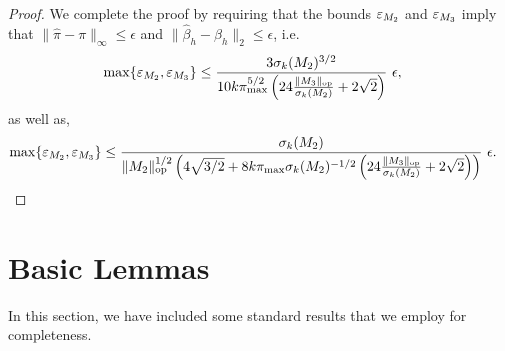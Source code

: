 \begin{proof}
We complete the proof by requiring that the bounds $\varepsilon_{M_2}$ and
$\varepsilon_{M_3}$ imply that $\|\hat \pi - \pi \|_{\infty} \le \epsilon$ and
$\|\hat \beta_h - \beta_h\|_2 \le \epsilon$, i.e.
\begin{align*}
  \max\{\varepsilon_{M_2}, \varepsilon_{M_3}\} &\le 
  \frac{3\sigma_k(M_2)^{3/2}}{10 k \pi_{\max}^{5/2}
  \left(24 \frac{\| {M_3} \|_{\text{\rm op}}}{\sigma_k(M_2)} + 2\sqrt{2} \right)}~ \epsilon,
\end{align*}
as well as,
\begin{align*}
  \max\{\varepsilon_{M_2}, \varepsilon_{M_3}\} 
  &\le 
  \frac{\sigma_k(M_2)}
    {\|M_2\|_{\text{\rm op}}^{1/2} \left(
    4\sqrt{3/2} + 8 k \pi_{\max} 
    \sigma_k(M_2)^{-1/2}
    \left(24 \frac{\| {M_3} \|_{\text{\rm op}}}{\sigma_k(M_2)} + 2\sqrt{2} \right) \right) }~ \epsilon.
\end{align*}


\end{proof}

\section{Basic Lemmas}

In this section, we have included some standard results that we employ for completeness.

